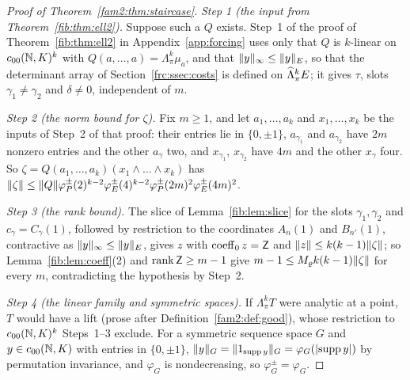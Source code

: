 \begin{proof}[Proof of Theorem~\ref{fam2:thm:staircase}]
\emph{Step 1 (the input from Theorem~\ref{fib:thm:ell2}).} Suppose such a $Q$ exists. Step~1 of the proof of
Theorem~\ref{fib:thm:ell2} in Appendix~\ref{app:forcing} uses only that $Q$ is $k$-linear on $c_{00}(\mathbb N,K)^k$ with
$Q(a,\dots,a)=\Lambda^k_\pi\mu_a$, and that $\lVert y\rVert_\infty\le\lVert y\rVert_E$, so that the determinant array of
Section~\ref{frc:ssec:costs} is defined on $\widehat\Lambda^k_\pi E$; it gives $\tau$, slots $\gamma_1\ne\gamma_2$ and $\delta\ne0$,
independent of $m$.

\emph{Step 2 (the norm bound for $\zeta$).} Fix $m\ge1$, and let $a_1,\dots,a_k$ and $x_1,\dots,x_k$ be the inputs of
Step~2 of that proof: their entries lie in $\{0,\pm1\}$, $a_{\gamma_1}$ and $a_{\gamma_2}$ have $2m$ nonzero entries and the
other $a_\gamma$ two, and $x_{\gamma_1}$, $x_{\gamma_2}$ have $4m$ and the other $x_\gamma$ four. So
$\zeta=Q(a_1,\dots,a_k)(x_1\wedge\dots\wedge x_k)$ has
$\lVert \zeta\rVert\le\lVert Q\rVert\varphi^\pm_P(2)^{k-2}\varphi^\pm_E(4)^{k-2}\varphi^\pm_P(2m)^2\varphi^\pm_E(4m)^2$.

\emph{Step 3 (the rank bound).} The slice of Lemma~\ref{fib:lem:slice} for the slots $\gamma_1,\gamma_2$ and
$c_\gamma=C_\gamma(1)$, followed by restriction to the coordinates $A_n(1)$ and $B_{n'}(1)$, contractive as
$\lVert y\rVert_\infty\le\lVert y\rVert_E$, gives $z$ with $\operatorname{coeff}_0z=\mathsf Z$ and $\lVert z\rVert\le k(k-1)\lVert \zeta\rVert$; so
Lemma~\ref{fib:lem:coeff}(2) and $\operatorname{rank}\mathsf Z\ge m-1$ give $m-1\le M_\varrho k(k-1)\lVert \zeta\rVert$ for every $m$, contradicting
the hypothesis by Step~2.

\emph{Step 4 (the linear family and symmetric spaces).} If $\Lambda^k_\pi T$ were analytic at a point,
$T$ would have a lift (prose after Definition~\ref{fam2:def:good}), whose restriction to $c_{00}(\mathbb N,K)^k$ Steps~1--3
exclude. For a symmetric sequence space $G$ and $y\in c_{00}(\mathbb N,K)$ with entries
in $\{0,\pm1\}$, $\lVert y\rVert_G=\lVert 1_{\operatorname{supp}y}\rVert_G=\varphi_G(\lvert \operatorname{supp}y\rvert)$ by permutation
invariance, and $\varphi_G$ is nondecreasing, so $\varphi^\pm_G=\varphi_G$.
\end{proof}


